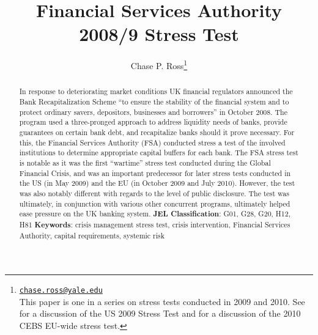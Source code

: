 \documentclass[12pt]{article}
\begin{document}
\lhead{}
\rhead{}

\renewcommand{\headrulewidth}{0.0pt}
\renewcommand{\footrulewidth}{0.0pt}


\title{Financial Services Authority 2008/9 Stress Test}%
\author{Chase P. Ross\thanks{\texttt{\href{mailto:chase.ross@yale.edu}{chase.ross@yale.edu}} \\ This paper is one in a series on stress tests conducted in 2009 and 2010. See \citet{Ross2016a} for a discussion of the US 2009 Stress Test and \citet{Ross2016b} for a discussion of the 2010 CEBS EU-wide stress test.}}



\maketitle

\begin{abstract}

In response to deteriorating market conditions UK financial regulators announced the Bank Recapitalization Scheme ``to ensure the stability of the financial system and to protect ordinary savers, depositors, businesses and borrowers'' in October 2008. The program used a three-pronged approach to address liquidity needs of banks, provide guarantees on certain bank debt, and recapitalize banks should it prove necessary. For this, the Financial Services Authority (FSA) conducted stress a test of the involved institutions to determine appropriate capital buffers for each bank. The FSA stress test is notable as it was the first ``wartime'' stress test conducted during the Global Financial Crisis, and was an important predecessor for later stress tests conducted in the US (in May 2009) and the EU (in October 2009 and July 2010). However, the test was also notably different with regards to the level of public disclosure. The test was ultimately, in conjunction with various other concurrent programs, ultimately helped ease pressure on the UK banking system.
\newline
\newline
\textbf{JEL Classification}: G01, G28, G20, H12, H81
\newline
\textbf{Keywords}: crisis management stress test, crisis intervention, Financial Services Authority, capital requirements, systemic risk

\end{abstract}
\newpage
\tableofcontents
\newpage
\end{document}
